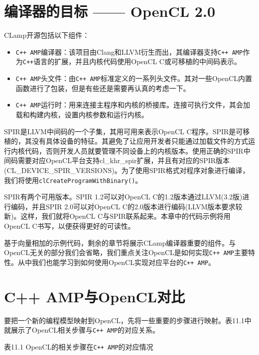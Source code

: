 \section{编译器的目标 —— OpenCL 2.0}

CLamp开源包括以下组件：

\begin{itemize}
\item \texttt{C++ AMP}编译器：该项目由Clang和LLVM衍生而出，其编译器支持\texttt{C++ AMP}作为\texttt{C++}语言的扩展，并且内核代码使用OpenCL C或可移植的中间码表示。
\item \texttt{C++ AMP}头文件：由\texttt{C++ AMP}标准定义的一系列头文件。其对一些OpenCL内置函数进行了包装，但是有些还是需要再认真的考虑一下。
\item \texttt{C++ AMP}运行时：用来连接主程序和内核的桥接库。连接可执行文件，其会加载和构建内核，设置内核参数和运行内核。
\end{itemize}

SPIR是LLVM中间码的一个子集，其用可用来表示OpenCL C程序。SPIR是可移植的，其没有具体设备的特征。其避免了让应用开发者只能通过加载文件的方式运行内核代码，否则开发人员就要管理不同设备上的内核版本。使用正确的SPIR中间码需要对应OpenCL平台支持cl\_\allowbreak{}khr\_\allowbreak{}spir扩展，并且有对应的SPIR版本(CL\_\allowbreak{}DEVICE\_\allowbreak{}SPIR\_\allowbreak{}VERSIONS)。为了使用SPIR格式对程序对象进行编译，我们将使用\texttt{clCreateProgramWithBinary()}。

SPIR有两个可用版本。SPIR 1.2可以对OpenCL C的1.2版本通过LLVM(3.2版)进行编码，并且SPIR 2.0可以对OpenCL C的2.0版本进行编码(LLVM版本要求较新)。这样，我们就将OpenCL C与SPIR联系起来。本章中的代码示例将用OpenCL C书写，以便获得更好的可读性。

基于向量相加的示例代码，剩余的章节将展示CLamp编译器重要的组件。与OpenCL无关的部分我们会省略，我们重点关注OpenCL是如何实现\texttt{C++ AMP}主要特性。从中我们也能学习到如何使用OpenCL实现对应平台的\texttt{C++ AMP}。



\section{C++ AMP与OpenCL对比}

要把一个新的编程模型映射到OpenCL，先将一些重要的步骤进行映射。表11.1中就展示了OpenCL相关步骤与\texttt{C++ AMP}的对应关系。

表11.1 OpenCL的相关步骤在\texttt{C++ AMP}的对应情况

